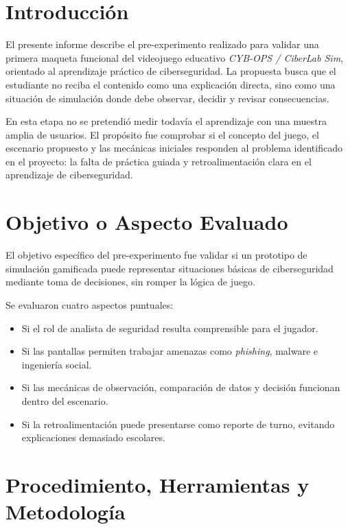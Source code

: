\documentclass[12pt]{article}
\begin{document}
\onehalfspacing

\tableofcontents
\newpage

\section{Introducción}

El presente informe describe el pre-experimento realizado para validar una primera maqueta funcional del videojuego educativo \textit{CYB-OPS / CiberLab Sim}, orientado al aprendizaje práctico de ciberseguridad. La propuesta busca que el estudiante no reciba el contenido como una explicación directa, sino como una situación de simulación donde debe observar, decidir y revisar consecuencias.

En esta etapa no se pretendió medir todavía el aprendizaje con una muestra amplia de usuarios. El propósito fue comprobar si el concepto del juego, el escenario propuesto y las mecánicas iniciales responden al problema identificado en el proyecto: la falta de práctica guiada y retroalimentación clara en el aprendizaje de ciberseguridad.

\section{Objetivo o Aspecto Evaluado}

El objetivo específico del pre-experimento fue validar si un prototipo de simulación gamificada puede representar situaciones básicas de ciberseguridad mediante toma de decisiones, sin romper la lógica de juego.

Se evaluaron cuatro aspectos puntuales:

\begin{itemize}
    \item Si el rol de analista de seguridad resulta comprensible para el jugador.
    \item Si las pantallas permiten trabajar amenazas como \textit{phishing}, malware e ingeniería social.
    \item Si las mecánicas de observación, comparación de datos y decisión funcionan dentro del escenario.
    \item Si la retroalimentación puede presentarse como reporte de turno, evitando explicaciones demasiado escolares.
\end{itemize}

\section{Procedimiento, Herramientas y Metodología}
\end{document}
